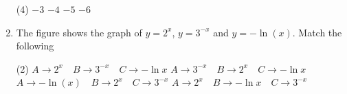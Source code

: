 \documentclass{article}
\begin{document}
\begin{enumerate}
        \begin{tasks}(4)
        	\task \( -3 \)
        	\task \( -4 \)
        	\task \( -5 \)
        	\task \( -6 \)\ans
        \end{tasks}
    \item The figure shows the graph of \( y = 2^x \), \( y = 3^{-x} \) and \( y = -\ln(x) \). Match the following
    \begin{center}
    \end{center}
    \begin{tasks}(2)
        \task \( A \rightarrow 2^x \quad B \rightarrow 3^{-x} \quad C \rightarrow -\ln x \)
        \task \( A \rightarrow 3^{-x} \quad B \rightarrow 2^x \quad C \rightarrow -\ln x \)\ans
        \task \( A \rightarrow -\ln(x) \quad B \rightarrow 2^x \quad C \rightarrow 3^{-x} \)
        \task \( A \rightarrow 2^x \quad B \rightarrow -\ln x \quad C \rightarrow 3^{-x} \)
      \end{tasks}


\end{enumerate}
\end{document}
